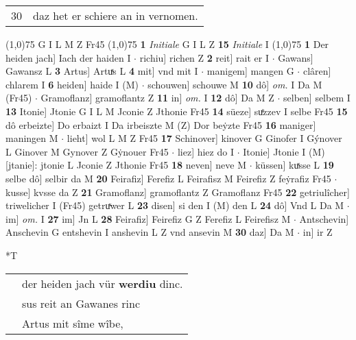 \documentclass[8pt,a4paper,notitlepage]{article}
\begin{document}
\begin{table}[ht]
\begin{minipage}[t]{0.5\linewidth}
\begin{tabular}{rl}
30 & daz het er schiere an in vernomen.\\ 
\end{tabular}
\scriptsize
\line(1,0){75} \newline
G I L M Z Fr45 \newline
\line(1,0){75} \newline
\textbf{1} \textit{Initiale} G I L Z  \textbf{15} \textit{Initiale} I  \newline
\line(1,0){75} \newline
\textbf{1} Der heiden jach] Iach der haiden I  $\cdot$ richiu] richen Z \textbf{2} reit] rait er I  $\cdot$ Gawans] Gawansz L \textbf{3} Artus] Artuͯs L \textbf{4} mit] vnd mit I  $\cdot$ manigem] mangen G  $\cdot$ clâren] chlarem I \textbf{6} heiden] haide I (M)  $\cdot$ schouwen] schouwe M \textbf{10} dô] \textit{om.} I Da M (Fr45)  $\cdot$ Gramoflanz] gramoflantz Z \textbf{11} in] \textit{om.} I \textbf{12} dô] Da M Z  $\cdot$ selben] selbem I \textbf{13} Itonie] Jtonie G I L M Jconie Z Jthonie Fr45 \textbf{14} süeze] suͤzzev I selbe Fr45 \textbf{15} dô erbeizte] Do erbaizt I Da irbeiszte M (Z) Dor beẏzte Fr45 \textbf{16} maniger] maningen M  $\cdot$ lieht] wol L M Z Fr45 \textbf{17} Schinover] kinover G Ginofer I Gýnover L Ginover M Gynover Z Gẏnouer Fr45  $\cdot$ liez] hiez do I  $\cdot$ Itonie] Jtonie I (M) [jtanie]: jtonie  L Jconie Z Jthonie Fr45 \textbf{18} neven] neve M  $\cdot$ küssen] kuͯsse L \textbf{19} selbe dô] selbir da M \textbf{20} Feirafiz] Ferefiz L Feirafisz M Feirefiz Z feẏrafiz Fr45  $\cdot$ kusse] kvsse da Z \textbf{21} Gramoflanz] gramoflantz Z Gramoflanz Fr45 \textbf{22} getriulîcher] triwelicher I (Fr45) getruͯwer L \textbf{23} disen] si den I (M) den L \textbf{24} dô] Vnd L Da M  $\cdot$ im] \textit{om.} I \textbf{27} im] Jn L \textbf{28} Feirafiz] Feirefiz G Z Ferefiz L Feirefisz M  $\cdot$ Antschevin] Anschevin G entshevin I anshevin L Z vnd ansevin M \textbf{30} daz] Da M  $\cdot$ in] ir Z \newline
\end{minipage}
\hspace{0.5cm}
\begin{minipage}[t]{0.5\linewidth}
\small
\begin{center}*T
\end{center}
\begin{tabular}{rl}
 & der heiden jach vür \textbf{werdiu} dinc.\\ 
 & sus reit an Gawanes rinc\\ 
 & Artus mit sîme wîbe,\\ 

\end{tabular}
\end{minipage}
\end{table}
\end{document}
